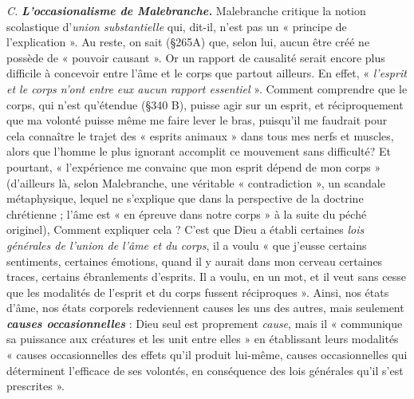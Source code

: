 {\it C.} \textbf{\textit {L'occasionalisme de Malebranche.}} Malebranche critique la
notion scolastique d'{\it union substantielle} qui, dit-il, n’est pas un
« principe de l'explication ». Au reste, on sait (\S265A) que, selon lui,
aucun être créé ne possède de « pouvoir causant ». Or un rapport de
causalité serait encore plus difficile à concevoir entre l’âme et le corps
que partout ailleurs. En effet, « {\it l'esprit et le corps n'ont entre eux
aucun rapport essentiel} ». Comment comprendre que le corps, qui
n’est qu’étendue (\S 340 B), puisse agir sur un esprit, et réciproquement
que ma volonté puisse même me faire lever le bras, puisqu'il me
faudrait pour cela connaître le trajet des « esprits animaux » dans
tous mes nerfs et muscles, alors que l’homme le plus ignorant accomplit
ce mouvement sans difficulté? Et pourtant, « l'expérience me
convainc que mon esprit dépend de mon corps »
{\scriptsize (d'ailleurs là, selon Malebranche, une véritable « contradiction », un scandale
métaphysique, lequel ne s'explique que dans la perspective de la doctrine chrétienne ;
l’âme est « en épreuve dans notre corps » à la suite du péché originel)}, Comment expliquer
cela ? C’est que Dieu a établi certaines {\it lois générales de l'union de
l'âme et du corps}, il a voulu « que j’eusse certains sentiments, certaines
émotions, quand il y aurait dans mon cerveau certaines traces, certains
ébranlements d’esprits. Il a voulu, en un mot, et il veut sans
cesse que les modalités de l’esprit et du corps fussent réciproques ».
Ainsi, nos états d’âme, nos états corporels redeviennent causes les
uns des autres, mais seulement \textbf{\textit {causes occasionnelles}} : Dieu seul est
proprement {\it cause}, mais il « communique sa puissance aux créatures
et les unit entre elles » en établissant leurs modalités « causes occasionnelles
des effets qu’il produit lui-même, causes occasionnelles qui
déterminent l’efficace de ses volontés, en conséquence des lois générales
qu'il s’est prescrites ».

